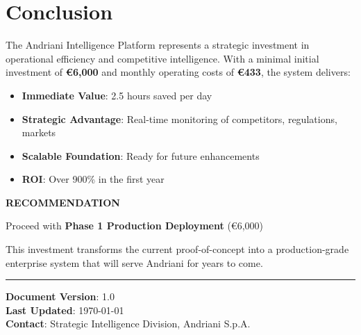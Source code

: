 \documentclass[11pt,a4paper]{article}
\begin{document}
\section{Conclusion}

The Andriani Intelligence Platform represents a strategic investment in operational efficiency and competitive intelligence. With a minimal initial investment of \textbf{\euro 6,000} and monthly operating costs of \textbf{\euro 433}, the system delivers:

\begin{itemize}[leftmargin=*]
    \item \textbf{Immediate Value}: 2.5 hours saved per day
    \item \textbf{Strategic Advantage}: Real-time monitoring of competitors, regulations, markets
    \item \textbf{Scalable Foundation}: Ready for future enhancements
    \item \textbf{ROI}: Over 900\% in the first year
\end{itemize}

\vspace{1cm}

\begin{tcolorbox}[colback=green!5!white,colframe=green!50!black,width=\textwidth,arc=3mm,boxrule=2pt]
\centering
\textbf{\large RECOMMENDATION}

\vspace{0.3cm}
Proceed with \textbf{Phase 1 Production Deployment} (\euro 6,000)

\vspace{0.2cm}
\small This investment transforms the current proof-of-concept into a production-grade enterprise system that will serve Andriani for years to come.
\end{tcolorbox}

\vspace{2cm}

\noindent\rule{\textwidth}{0.4pt}

\vspace{0.5cm}

\noindent
\textbf{Document Version}: 1.0\\
\textbf{Last Updated}: \today\\
\textbf{Contact}: Strategic Intelligence Division, Andriani S.p.A.
\end{document}
